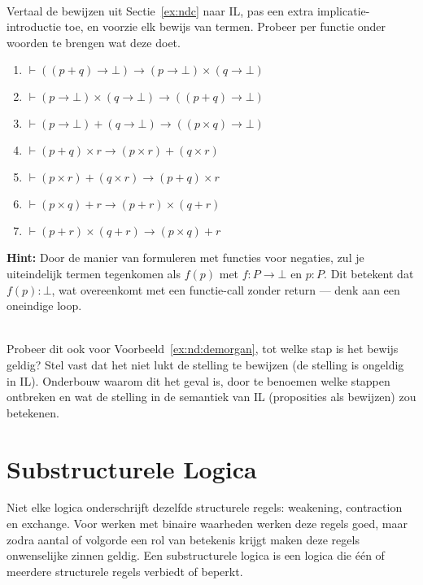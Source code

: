 \begin{exercise}\mbox{}\\
  Vertaal de bewijzen uit Sectie~\ref{ex:ndc} naar IL, pas een extra implicatie-introductie toe, en voorzie elk bewijs van termen. Probeer per functie onder woorden te brengen wat deze doet.

\begin{enumerate}[label=\textit{\alph*.}]
\item $\vdash ((p + q) \to \bot) \to ( p \to \bot)\times( q \to \bot)$ \\
\item $\vdash ( p \to \bot)\times( q \to \bot) \to ((p + q) \to \bot)$ \\
\item $\vdash ( p \to \bot)  +( q \to \bot) \to ((p\times q) \to \bot)$ \\
\item $\vdash (p + q)\times r \to (p\times r) + (q\times r)$ \\
\item $\vdash (p\times r) + (q\times r) \to (p + q)\times r$  \\
\item $\vdash (p\times q) + r \to (p + r)\times(q + r)$ \\
\item $\vdash (p + r)\times(q + r) \to (p\times q) + r$  \\
\end{enumerate}\vspace{3mm}

\textbf{Hint:} Door de manier van formuleren met functies voor negaties, zul je uiteindelijk termen tegenkomen als $f(p)$ met $f : P \to \bot$ en $p : P$. Dit betekent dat $f(p) : \bot$, wat overeenkomt met een functie-call zonder return --- denk aan een oneindige loop.

\end{exercise}

\begin{exercise}\mbox{}\\
Probeer dit ook voor Voorbeeld~\ref{ex:nd:demorgan}, tot welke stap is het bewijs geldig? Stel vast dat het niet lukt de stelling te bewijzen (de stelling is ongeldig in IL). Onderbouw waarom dit het geval is, door te benoemen welke stappen ontbreken en wat de stelling in de semantiek van IL (proposities als bewijzen) zou betekenen.
\end{exercise}

\section{Substructurele Logica}
Niet elke logica onderschrijft dezelfde structurele regels: weakening, contraction en exchange. Voor werken met binaire waarheden werken deze regels goed, maar zodra aantal of volgorde een rol van betekenis krijgt maken deze regels onwenselijke zinnen geldig. Een substructurele logica is een logica die \'e\'en of meerdere structurele regels verbiedt of beperkt.


